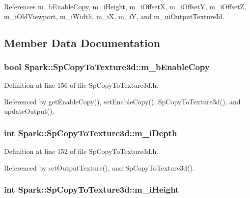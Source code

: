 References m\_\-b\-Enable\-Copy, m\_\-i\-Height, m\_\-i\-Offset\-X, m\_\-i\-Offset\-Y, m\_\-i\-Offset\-Z, m\_\-i\-Old\-Viewport, m\_\-i\-Width, m\_\-i\-X, m\_\-i\-Y, and m\_\-ui\-Output\-Texture\-Id.

\subsection{Member Data Documentation}
\subsubsection{\setlength{\rightskip}{0pt plus 5cm}bool {\bf Spark::Sp\-Copy\-To\-Texture3d::m\_\-b\-Enable\-Copy}\hspace{0.3cm}{\tt  [protected]}}\label{classSpark_1_1SpCopyToTexture3d_p10}


Definition at line 156 of file Sp\-Copy\-To\-Texture3d.h.

Referenced by get\-Enable\-Copy(), set\-Enable\-Copy(), Sp\-Copy\-To\-Texture3d(), and update\-Output().
\subsubsection{\setlength{\rightskip}{0pt plus 5cm}int {\bf Spark::Sp\-Copy\-To\-Texture3d::m\_\-i\-Depth}\hspace{0.3cm}{\tt  [protected]}}\label{classSpark_1_1SpCopyToTexture3d_p8}


Definition at line 152 of file Sp\-Copy\-To\-Texture3d.h.

Referenced by set\-Output\-Texture(), and Sp\-Copy\-To\-Texture3d().
\subsubsection{\setlength{\rightskip}{0pt plus 5cm}int {\bf Spark::Sp\-Copy\-To\-Texture3d::m\_\-i\-Height}\hspace{0.3cm}{\tt  [protected]}}\label{classSpark_1_1SpCopyToTexture3d_p7}


